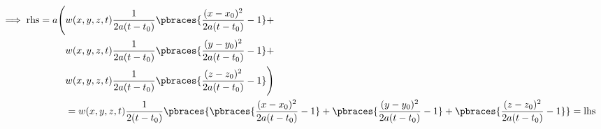 \begin{solution}
\begin{enumerate}[label = (\roman*)]
    \begin{align*}
        \implies
        \text{rhs}
        =
        a
        \Bigg (
            & w(x, y, z, t)
            \frac{1}{2a (t - t_0)}
            \pbraces
            {
                \frac{(x - x_0)^2}{2a (t - t_0)} - 1
            }
            + \\
            & w(x, y, z, t)
            \frac{1}{2a (t - t_0)}
            \pbraces
            {
                \frac{(y - y_0)^2}{2a (t - t_0)} - 1
            }
            + \\
            & w(x, y, z, t)
            \frac{1}{2a (t - t_0)}
            \pbraces
            {
                \frac{(z - z_0)^2}{2a (t - t_0)} - 1
            }
        \Bigg ) \\
        & =
        w(x, y, z, t)
        \frac{1}{2 (t - t_0)}
        \pbraces
        {
            \pbraces
            {
                \frac{(x - x_0)^2}{2a (t - t_0)} - 1
            }
            +
            \pbraces
            {
                \frac{(y - y_0)^2}{2a (t - t_0)} - 1
            }
            +
            \pbraces
            {
                \frac{(z - z_0)^2}{2a (t - t_0)} - 1
            }
        }
        =
        \text{lhs}
    \end{align*}

\end{enumerate}

\end{solution}

